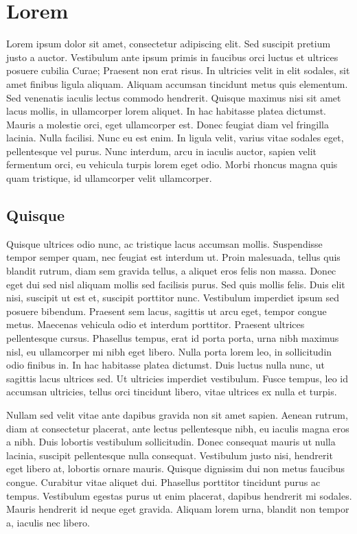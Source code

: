 \chapter{Lorem}

\setcounter{page}{1}

Lorem ipsum dolor sit amet, consectetur adipiscing elit. Sed suscipit pretium justo a auctor. Vestibulum ante ipsum primis in faucibus orci luctus et ultrices posuere cubilia Curae; Praesent non erat risus. In ultricies velit in elit sodales, sit amet finibus ligula aliquam. Aliquam accumsan tincidunt metus quis elementum. Sed venenatis iaculis lectus commodo hendrerit. Quisque maximus nisi sit amet lacus mollis, in ullamcorper lorem aliquet. In hac habitasse platea dictumst. Mauris a molestie orci, eget ullamcorper est. Donec feugiat diam vel fringilla lacinia. Nulla facilisi. Nunc eu est enim. In ligula velit, varius vitae sodales eget, pellentesque vel purus. Nunc interdum, arcu in iaculis auctor, sapien velit fermentum orci, eu vehicula turpis lorem eget odio. Morbi rhoncus magna quis quam tristique, id ullamcorper velit ullamcorper.

\section{Quisque}

Quisque ultrices odio nunc, ac tristique lacus accumsan mollis. Suspendisse tempor semper quam, nec feugiat est interdum ut. Proin malesuada, tellus quis blandit rutrum, diam sem gravida tellus, a aliquet eros felis non massa. Donec eget dui sed nisl aliquam mollis sed facilisis purus. Sed quis mollis felis. Duis elit nisi, suscipit ut est et, suscipit porttitor nunc. Vestibulum imperdiet ipsum sed posuere bibendum. Praesent sem lacus, sagittis ut arcu eget, tempor congue metus. Maecenas vehicula odio et interdum porttitor. Praesent ultrices pellentesque cursus. Phasellus tempus, erat id porta porta, urna nibh maximus nisl, eu ullamcorper mi nibh eget libero. Nulla porta lorem leo, in sollicitudin odio finibus in. In hac habitasse platea dictumst. Duis luctus nulla nunc, ut sagittis lacus ultrices sed. Ut ultricies imperdiet vestibulum. Fusce tempus, leo id accumsan ultricies, tellus orci tincidunt libero, vitae ultrices ex nulla et turpis.

Nullam sed velit vitae ante dapibus gravida non sit amet sapien. Aenean rutrum, diam at consectetur placerat, ante lectus pellentesque nibh, eu iaculis magna eros a nibh. Duis lobortis vestibulum sollicitudin. Donec consequat mauris ut nulla lacinia, suscipit pellentesque nulla consequat. Vestibulum justo nisi, hendrerit eget libero at, lobortis ornare mauris. Quisque dignissim dui non metus faucibus congue. Curabitur vitae aliquet dui. Phasellus porttitor tincidunt purus ac tempus. Vestibulum egestas purus ut enim placerat, dapibus hendrerit mi sodales. Mauris hendrerit id neque eget gravida. Aliquam lorem urna, blandit non tempor a, iaculis nec libero.

